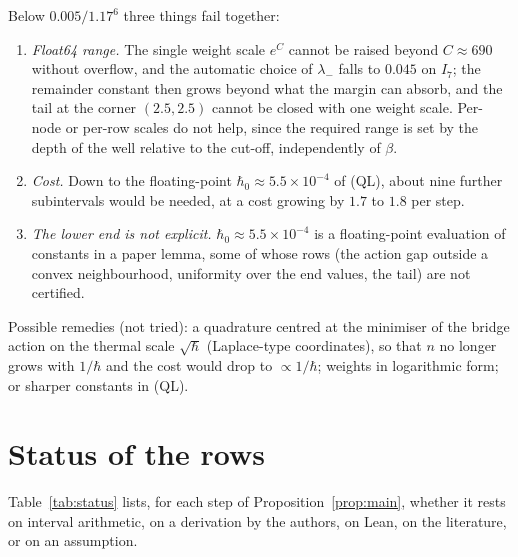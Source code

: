 \documentclass[11pt,a4paper]{article}
\theoremstyle{definition}
\theoremstyle{remark}
\begin{document}
Below $0.005/1.17^6$ three things fail together:
\begin{enumerate}[leftmargin=2em]
\item \emph{Float64 range.} The single weight scale $e^{C}$ cannot be raised beyond $C\approx690$ without overflow, and the automatic choice of $\lambda_-$ falls to $0.045$ on $I_7$; the remainder constant then grows beyond what the margin can absorb, and the tail at the corner $(2.5,2.5)$ cannot be closed with one weight scale. Per-node or per-row scales do not help, since the required range is set by the depth of the well relative to the cut-off, independently of $\beta$.
\item \emph{Cost.} Down to the floating-point $\hbar_0\approx5.5\times10^{-4}$ of (QL), about nine further subintervals would be needed, at a cost growing by $1.7$ to $1.8$ per step.
\item \emph{The lower end is not explicit.} $\hbar_0\approx5.5\times10^{-4}$ is a floating-point evaluation of constants in a paper lemma, some of whose rows (the action gap outside a convex neighbourhood, uniformity over the end values, the tail) are not certified.
\end{enumerate}
Possible remedies (not tried): a quadrature centred at the minimiser of the bridge action on the thermal scale $\sqrt\hbar$ (Laplace-type coordinates), so that $n$ no longer grows with $1/\hbar$ and the cost would drop to $\propto1/\hbar$; weights in logarithmic form; or sharper constants in (QL).

\section{Status of the rows}\label{sec:statusrows}

Table~\ref{tab:status} lists, for each step of Proposition~\ref{prop:main}, whether it rests on interval arithmetic, on a derivation by the authors, on Lean, on the literature, or on an assumption.
\end{document}
